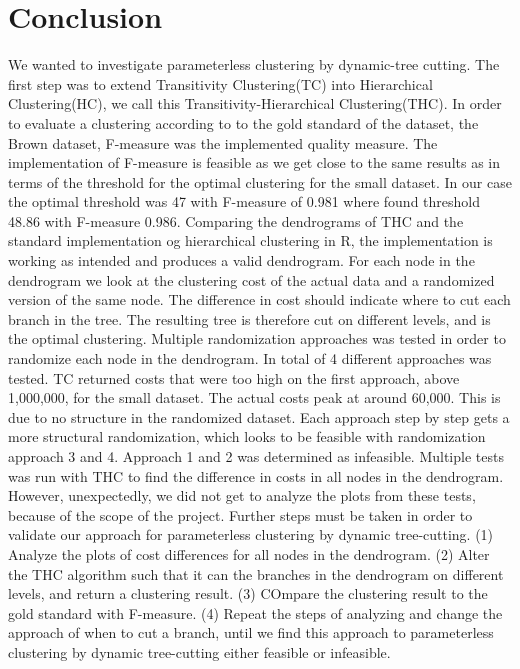 \documentclass[a4paper,10pt]{article}
\theoremstyle{plain}
\theoremstyle{definition}
\begin{document}
\section{Conclusion}
We wanted to investigate parameterless clustering by dynamic-tree cutting. The first step was to extend Transitivity Clustering(TC) into Hierarchical Clustering(HC), we call this Transitivity-Hierarchical Clustering(THC). In order to evaluate a clustering according to to the gold standard of the dataset, the Brown dataset, F-measure was the implemented quality measure. The implementation of F-measure is feasible as we get close to the same results as \cite{clustEval} in terms of the threshold for the optimal clustering for the small dataset. In our case the optimal threshold was 47 with F-measure of 0.981 where \cite{clustEval} found threshold 48.86 with F-measure 0.986. Comparing the dendrograms of THC and the standard implementation og hierarchical clustering in R, the implementation is working as intended and produces a valid dendrogram. For each node in the dendrogram we look at the clustering cost of the actual data and a randomized version of the same node. The difference in cost should indicate where to cut each branch in the tree. The resulting tree is therefore cut on different levels, and is the optimal clustering. Multiple randomization approaches was tested in order to randomize each node in the dendrogram. In total of 4 different approaches was tested. TC returned costs that were too high on the first approach, above 1,000,000, for the small dataset. The actual costs peak at around 60,000. This is due to no structure in the randomized dataset. Each approach step by step gets a more structural randomization, which looks to be feasible with randomization approach 3 and 4. Approach 1 and 2 was determined as infeasible. Multiple tests was run with THC to find the difference in costs in all nodes in the dendrogram. However, unexpectedly, we did not get to analyze the plots from these tests, because of the scope of the project. Further steps must be taken in order to validate our approach for parameterless clustering by dynamic tree-cutting. (1) Analyze the plots of cost differences for all nodes in the dendrogram. (2) Alter the THC algorithm such that it can the branches in the dendrogram on different levels, and return a clustering result. (3) COmpare the clustering result to the gold standard with F-measure. (4) Repeat the steps of analyzing and change the approach of when to cut a branch, until we find this approach to parameterless clustering by dynamic tree-cutting either feasible or infeasible.


\newpage


\end{document}
